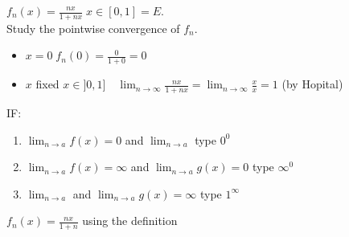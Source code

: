 \begin{example}
    $f_n(x)=\frac{nx}{1+nx}\; x\in[0,1]=E$.\\
    Study the pointwise convergence of $f_n$.\\
    \begin{itemize}
        \item $x=0\;f_n(0)=\frac{0}{1+0}=0$ 
        \item $x$ fixed $x\in]0,1]\quad \lim_{n \to \infty} \frac{nx}{1+nx}=\lim_{n \to \infty}\frac{x}{x}=1 $ (by Hopital)
    \end{itemize}
\end{example}
IF:
\begin{enumerate}
    \item $\lim_{n \to a}f(x)=0 $ and $\lim_{n \to a} $ type $0^0$
         \item $\lim_{n \to a}f(x)=\infty $ and $\lim_{n \to a}g(x)=0 $ type $\infty^0$ 
         \item $ \lim_{n \to a} $ and $\lim_{n \to a}g(x)=\infty $ type $1^\infty$
\end{enumerate}
\begin{example}
    $f_n(x)=\frac{nx}{1+n}$ using the definition
\end{example}
